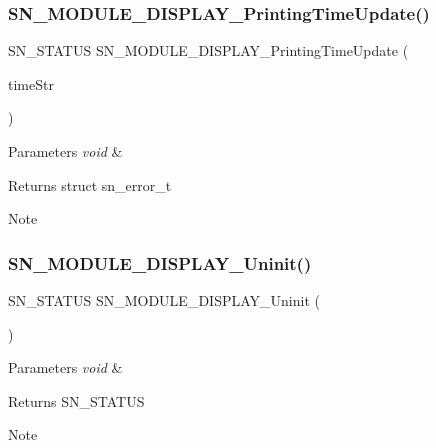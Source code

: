 \subsubsection{\texorpdfstring{S\+N\+\_\+\+M\+O\+D\+U\+L\+E\+\_\+\+D\+I\+S\+P\+L\+A\+Y\+\_\+\+Printing\+Time\+Update()}{SN\_MODULE\_DISPLAY\_PrintingTimeUpdate()}}
{\footnotesize\ttfamily S\+N\+\_\+\+S\+T\+A\+T\+US S\+N\+\_\+\+M\+O\+D\+U\+L\+E\+\_\+\+D\+I\+S\+P\+L\+A\+Y\+\_\+\+Printing\+Time\+Update (\begin{DoxyParamCaption}\item[{const char $\ast$}]{time\+Str }\end{DoxyParamCaption})}


\begin{DoxyParams}{Parameters}
{\em void} & \\
\hline
\end{DoxyParams}
\begin{DoxyReturn}{Returns}
struct sn\+\_\+error\+\_\+t 
\end{DoxyReturn}
\begin{DoxyNote}{Note}

\end{DoxyNote}
\mbox{\label{group__Module_ga91f86811b5f4b83be3296c64ccd253ec}} 
\subsubsection{\texorpdfstring{S\+N\+\_\+\+M\+O\+D\+U\+L\+E\+\_\+\+D\+I\+S\+P\+L\+A\+Y\+\_\+\+Uninit()}{SN\_MODULE\_DISPLAY\_Uninit()}}
{\footnotesize\ttfamily S\+N\+\_\+\+S\+T\+A\+T\+US S\+N\+\_\+\+M\+O\+D\+U\+L\+E\+\_\+\+D\+I\+S\+P\+L\+A\+Y\+\_\+\+Uninit (\begin{DoxyParamCaption}\item[{void}]{ }\end{DoxyParamCaption})}


\begin{DoxyParams}{Parameters}
{\em void} & \\
\hline
\end{DoxyParams}
\begin{DoxyReturn}{Returns}
S\+N\+\_\+\+S\+T\+A\+T\+US 
\end{DoxyReturn}
\begin{DoxyNote}{Note}

\end{DoxyNote}
